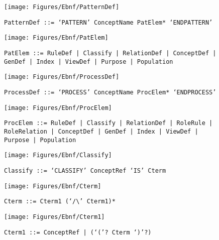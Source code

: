  \begin{figure}[H]
  \centering
  \texttt{[image: Figures/Ebnf/PatternDef]}
  \caption*{\texttt{PatternDef \small::=  `PATTERN' ConceptName PatElem* `ENDPATTERN'}}
  \label{fig:ebnf-PatternDef}
 \end{figure}

 \begin{figure}[H]
  \centering
  \texttt{[image: Figures/Ebnf/PatElem]}
  \caption*{\texttt{PatElem \small::=  RuleDef | Classify | RelationDef | ConceptDef | GenDef | Index | ViewDef | Purpose | Population}}
  \label{fig:ebnf-PatElem}
 \end{figure}

 \begin{figure}[H]
  \centering
  \texttt{[image: Figures/Ebnf/ProcessDef]}
  \caption*{\texttt{ProcessDef \small::=  `PROCESS' ConceptName ProcElem* `ENDPROCESS'}}
  \label{fig:ebnf-ProcessDef}
 \end{figure}

 \begin{figure}[H]
  \centering
  \texttt{[image: Figures/Ebnf/ProcElem]}
  \caption*{\texttt{ProcElem \small::=  RuleDef | Classify | RelationDef | RoleRule | RoleRelation | ConceptDef | GenDef | Index | ViewDef | Purpose | Population}}
  \label{fig:ebnf-ProcElem}
 \end{figure}

 \begin{figure}[H]
  \centering
  \texttt{[image: Figures/Ebnf/Classify]}
  \caption*{\texttt{Classify \small::=  `CLASSIFY' ConceptRef `IS' Cterm}}
  \label{fig:ebnf-Classify}
 \end{figure}

 \begin{figure}[H]
  \centering
  \texttt{[image: Figures/Ebnf/Cterm]}
  \caption*{\texttt{Cterm \small::=  Cterm1 (`/\textbackslash{}' Cterm1)*}}
  \label{fig:ebnf-Cterm}
 \end{figure}

 \begin{figure}[H]
  \centering
  \texttt{[image: Figures/Ebnf/Cterm1]}
  \caption*{\texttt{Cterm1 \small::=  ConceptRef | (`('? Cterm `)'?)}}
  \label{fig:ebnf-Cterm1}
 \end{figure}

